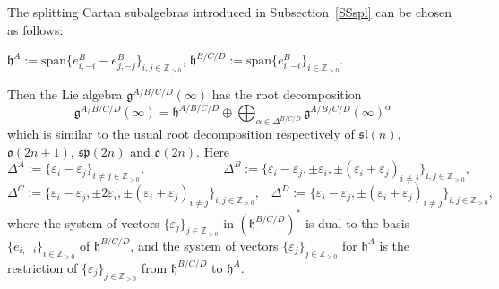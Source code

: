 \documentclass{emsprocart}
\newcommand{\PenkovPetukhovBr}[1]{\mathrm{span}\{#1\}}
\begin{document}
The splitting Cartan subalgebras introduced in Subsection~\ref{SSspl} can be chosen as follows:
\begin{center}$\mathfrak h^A:=\PenkovPetukhovBr{e_{i, -i}^B-e_{j, -j}^B}_{i, j\in\mathbb Z_{>0}}$, $\mathfrak h^{B/C/D}:=\PenkovPetukhovBr{e^{B}_{i, -i}}_{i\in\mathbb Z_{>0}}$.\end{center}
Then the Lie algebra $\mathfrak g^{A/B/C/D}(\infty)$ has the root decomposition $$\mathfrak g^{A/B/C/D}(\infty)=\mathfrak h^{A/B/C/D}\oplus\bigoplus_{\alpha\in\Delta^{B/C/D}}\mathfrak g^{A/B/C/D}(\infty)^{\alpha}$$
which is similar to the usual root decomposition  respectively of $\mathfrak{sl}(n)$, $\mathfrak o(2n+1)$, $\mathfrak{sp}(2n)$ and $\mathfrak o(2n)$. Here
$$\Delta^A:=\{\varepsilon_i-\varepsilon_j\}_{i\ne j\in\mathbb Z_{>0}},\hspace{74pt}\Delta^B:=\{\varepsilon_i-\varepsilon_j, \pm\varepsilon_i, \pm(\varepsilon_i+\varepsilon_j)_{i\ne j}\}_{i, j\in\mathbb Z_{>0}},$$
$$\Delta^C:=\{\varepsilon_i-\varepsilon_j, \pm2\varepsilon_i, \pm(\varepsilon_i+\varepsilon_j)_{i\ne j}\}_{i, j\in\mathbb Z_{>0}},\hspace{10pt}\Delta^D:=\{\varepsilon_i-\varepsilon_j, \pm(\varepsilon_i+\varepsilon_j)_{i\ne j}\}_{i, j\in\mathbb Z_{>0}},$$
where the system of vectors $\{\varepsilon_j\}_{j\in\mathbb Z_{>0}}$ in $(\mathfrak h^{B/C/D})^*$ is dual to the basis $\{e_{i, -i}\}_{i\in\mathbb Z_{>0}}$ of $\mathfrak h^{B/C/D}$, and the system of vectors $\{\varepsilon_j\}_{j\in\mathbb Z_{>0}}$ for $\mathfrak h^A$ is the restriction of $\{\varepsilon_j\}_{j\in\mathbb Z_{>0}}$ from $\mathfrak h^{B/C/D}$ to $\mathfrak h^A$.
\end{document}
